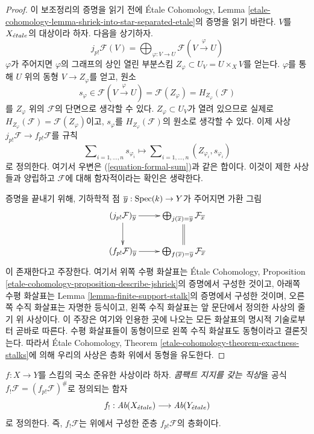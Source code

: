 \begin{proof}
이 보조정리의 증명을 읽기 전에 \'Etale Cohomology, Lemma
\ref{etale-cohomology-lemma-shriek-into-star-separated-etale}의
증명을 읽기 바란다. $V$를 $X_{\acute{e}tale}$의 대상이라 하자. 다음을
상기하자.
$$
j_{p!}\mathcal{F}(V) =
\bigoplus\nolimits_{\varphi : V \to U} \mathcal{F}(V \xrightarrow{\varphi} U)
$$
$\varphi$가 주어지면 $\varphi$의 그래프의 상인 열린 부분스킴
$Z_\varphi \subset U_V = U \times_X V$를 얻는다. $\varphi$를 통해
$U$ 위의 동형 $V \to Z_\varphi$를 얻고, 원소
$$
s_\varphi \in \mathcal{F}(V \xrightarrow{\varphi} U) =
\mathcal{F}(Z_\varphi) = H_{Z_\varphi}(\mathcal{F})
$$
를 $Z_{\varphi}$ 위의 $\mathcal{F}$의 단면으로 생각할 수 있다.
$Z_\varphi \subset U_V$가 열려 있으므로 실제로
$H_{Z_\varphi}(\mathcal{F}) = \mathcal{F}(Z_\varphi)$이고,
$s_\varphi$를 $H_{Z_\varphi}(\mathcal{F})$의 원소로 생각할 수 있다.
이제 사상 $j_{p!}\mathcal{F} \to f_{p!}\mathcal{F}$를 규칙
$$
\sum\nolimits_{i = 1, \ldots, n} s_{\varphi_i}
\longmapsto
\sum\nolimits_{i = 1, \ldots, n} (Z_{\varphi_i}, s_{\varphi_i})
$$
로 정의한다. 여기서 우변은 (\ref{equation-formal-sum})과 같은 합이다.
이것이 제한 사상들과 양립하고 $\mathcal{F}$에 대해 함자적이라는
확인은 생략한다.

\medskip\noindent
증명을 끝내기 위해, 기하학적 점
$\overline{y} : \mathop{\mathrm{Spec}}(k) \to Y$가 주어지면 가환 그림
$$
\xymatrix{
(j_{p!}\mathcal{F})_{\overline{y}} \ar[r] \ar[d] &
\bigoplus_{j(\overline{x}) = \overline{y}} \mathcal{F}_{\overline{x}}
\ar@{=}[d] \\
(f_{p!}\mathcal{F})_{\overline{y}} \ar[r] &
\bigoplus_{f(\overline{x}) = \overline{y}} \mathcal{F}_{\overline{x}}
}
$$
이 존재한다고 주장한다. 여기서 위쪽 수평 화살표는
\'Etale Cohomology, Proposition
\ref{etale-cohomology-proposition-describe-jshriek}의 증명에서
구성한 것이고, 아래쪽 수평 화살표는 Lemma
\ref{lemma-finite-support-stalk}의 증명에서 구성한 것이며, 오른쪽
수직 화살표는 자명한 등식이고, 왼쪽 수직 화살표는 앞 문단에서
정의한 사상의 줄기 위 사상이다. 이 주장은 여기와 인용한 곳에
나오는 모든 화살표의 명시적 기술로부터 곧바로 따른다.
수평 화살표들이 동형이므로 왼쪽 수직 화살표도 동형이라고 결론짓는다.
따라서 \'Etale Cohomology, Theorem
\ref{etale-cohomology-theorem-exactness-stalks}에 의해 우리의 사상은
층화 위에서 동형을 유도한다.
\end{proof}

\begin{definition}
\label{definition-f-shriek-lqf}
$f : X \to Y$를 스킴의 국소 준유한 사상이라 하자. {\it 콤팩트
지지를 갖는 직상}을 공식 $f_!\mathcal{F} = (f_{p!}\mathcal{F})^\#$로
정의되는 함자
$$
f_! : \textit{Ab}(X_{\acute{e}tale}) \longrightarrow \textit{Ab}(Y_{\acute{e}tale})
$$
로 정의한다. 즉, $f_!\mathcal{F}$는 위에서 구성한 준층
$f_{p!}\mathcal{F}$의 층화이다.
\end{definition}


